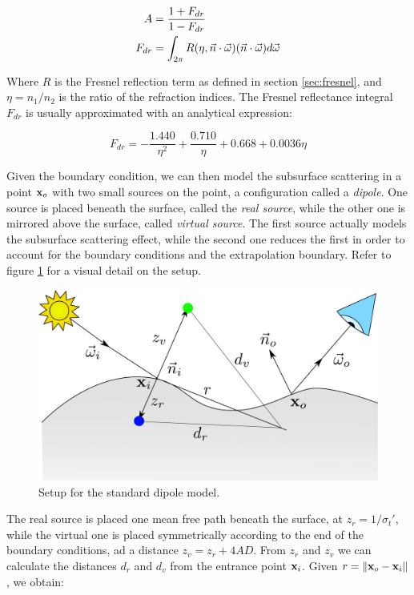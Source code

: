 \begin{equation}
\begin{split}
A &= \frac{1 + F_{dr}}{1 - F_{dr}} \\
F_{dr} &= \int_{2\pi} R(\eta, \vec{n} \cdot \vec{\omega})  (\vec{n} \cdot \vec{\omega}) d \vec{\omega}
\end{split}
\end{equation}

Where $R$ is the Fresnel reflection term as defined in section \ref{sec:fresnel}, and $\eta = n_1 / n_2$ is the ratio of the refraction indices. The Fresnel reflectance integral $F_{dr}$ is usually approximated with an analytical expression:

$$
F_{dr} = -\frac{1.440}{\eta^2} + \frac{0.710}{\eta} + 0.668 + 0.0036 \eta
$$

Given the boundary condition, we can then model the subsurface scattering in a point $\mathbf{x}_o$ with two small sources on the point, a configuration called a \emph{dipole}. One source is placed beneath the surface, called the \emph{real source}, while the other one is mirrored above the surface, called \emph{virtual source}. The first source actually models the subsurface scattering effect, while the second one reduces the first in order to account for the boundary conditions and the extrapolation boundary. Refer to figure \ref{fig:jensen} for a visual detail on the setup.


\begin{figure}[!ht]
\centering
\includegraphics[width=\textwidth]{images/jensen.pdf}
\caption{Setup for the standard dipole model.}
\label{fig:jensen}
\end{figure}

The real source is placed one mean free path beneath the surface, at $z_r = 1 / \sigma_t'$, while the virtual one is placed symmetrically according to the end of the boundary conditions, ad a distance $z_v = z_r + 4 A D$. From $z_r$ and $z_v$ we can calculate the distances $d_r$ and $d_v$ from the entrance point $\mathbf{x}_i$. Given $r = \|\mathbf{x}_o -\mathbf{x}_i\|$, we obtain:


